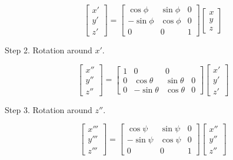 \begin{equation}\label{eqn:classicalMechanicsEulerAngles:20}
\begin{bmatrix}
x' \\
y' \\
z'
\end{bmatrix}
=
\begin{bmatrix}
\cos\phi & \sin\phi & 0 \\
-\sin\phi & \cos\phi & 0 \\
0 & 0 & 1
\end{bmatrix}
\begin{bmatrix}
x \\
y \\
z
\end{bmatrix}
\end{equation}

Step 2.  Rotation around $x'$.

\begin{equation}\label{eqn:classicalMechanicsEulerAngles:40}
\begin{bmatrix}
x'' \\
y'' \\
z''
\end{bmatrix}
=
\begin{bmatrix}
1 & 0 & 0 \\
0 & \cos\theta & \sin\theta & 0 \\
0 & -\sin\theta & \cos\theta & 0 
\end{bmatrix}
\begin{bmatrix}
x' \\
y' \\
z'
\end{bmatrix}
\end{equation}

Step 3.  Rotation around $z''$.

\begin{equation}\label{eqn:classicalMechanicsEulerAngles:60}
\begin{bmatrix}
x''' \\
y''' \\
z'''
\end{bmatrix}
=
\begin{bmatrix}
\cos\psi & \sin\psi & 0 \\
-\sin\psi & \cos\psi & 0 \\
0 & 0 & 1
\end{bmatrix}
\begin{bmatrix}
x'' \\
y'' \\
z''
\end{bmatrix}
\end{equation}

